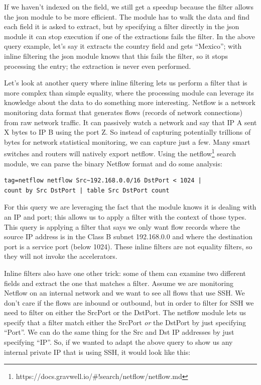 If we haven't indexed on the  field, we still get a speedup
because the filter allows the json module to be more efficient. The
 module has to walk the data and find each field it is asked to
extract, but by specifying a filter directly in the json module it can
stop execution if one of the extractions fails the filter. In the above
query example, let's say it extracts the country field and gets ``Mexico'';
with inline filtering the json module knows that this fails the
filter, so it stops processing the entry; the  extraction is
never even performed.

Let's look at another query where inline
filtering lets us perform a filter that is more complex than simple
equality, where the processing module can leverage its knowledge about
the data to do something more interesting. Netflow is a network monitoring data format that generates flows
(records of network connections) from raw network traffic. It can passively watch a network and say that
IP A sent X bytes to IP B using the port Z. So instead of capturing
potentially trillions of bytes for network statistical monitoring, we can
capture just a few. Many smart switches and routers will natively
export netflow.
Using the netflow\footnote{https://docs.gravwell.io/\#!search/netflow/netflow.md} search
module, we can parse the binary Netflow format and do some analysis:

\begin{Verbatim}[breaklines=true]
tag=netflow netflow Src~192.168.0.0/16 DstPort < 1024 |
count by Src DstPort | table Src DstPort count
\end{Verbatim}

For this query we are leveraging the fact that the  module
knows it is dealing with an IP and port; this allows us to apply a
filter with the context of those types. This query is applying a filter
that says we only want flow records where the source IP address is in
the Class B subnet 192.168.0.0 and where the destination port is a
service port (below 1024). These inline filters are not equality
filters, so they will not invoke the accelerators.

Inline filters also have one other trick: some of them can examine two
different fields and extract the one that matches a filter. Assume we
are monitoring Netflow on an internal network and we want to see all
flows that use SSH. We don't care if the flows are inbound or outbound,
but in order to filter for SSH we need to filter on either the SrcPort
or the DstPort. The netflow module lets us specify that a filter match
either the SrcPort \emph{or} the DstPort by just specifying ``Port''. We can do the
same thing for the Src and Dst IP addresses by just specifying ``IP''. So, if we wanted to adapt
the above query to show us any internal private IP that is using
SSH, it would look like this:

